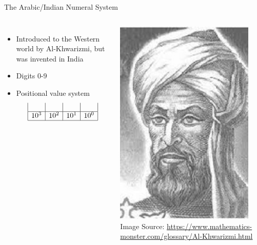 \documentclass{beamer}
\begin{document}
\begin{frame}{The Arabic/Indian Numeral System}
\begin{columns}
\begin{itemize}[<+(1)->]
    \item Introduced to the Western world by Al-Khwarizmi, but was invented in India
    \item Digits 0-9
    \item Positional value system
    \[
    \begin{array}{|l|l|l|l|}
        & & & \\
        \hline
        10^3 & 10^2 & 10^1 & 10^0\\
        \hline
    \end{array}
    \]
\end{itemize}

\includegraphics[width=0.9\textwidth]{images/Al-Khwarizmi}
{\tiny Image Source:
\newline \url{https://www.mathematics-monster.com/glossary/Al-Khwarizmi.html}}
\end{columns}

\end{frame}
\end{document}
